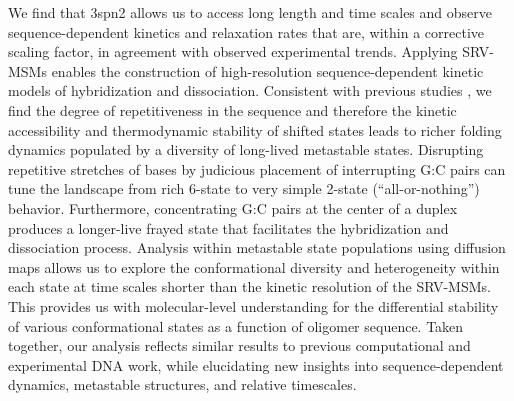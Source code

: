 \documentclass[journal=jpcbfk,manuscript=article]{achemso}
\begin{document}
We find that 3spn2 allows us to access long length and time scales and observe sequence-dependent kinetics and relaxation rates that are, within a corrective scaling factor, in agreement with observed experimental trends. Applying SRV-MSMs enables the construction of high-resolution sequence-dependent kinetic models of hybridization and dissociation. Consistent with previous studies \citep{Phys2014,Romano2013DNADependence,Araque2016LatticeCooperativity}, we find the degree of repetitiveness in the sequence and therefore the kinetic accessibility and thermodynamic stability of shifted states leads to richer folding dynamics populated by a diversity of long-lived metastable states. Disrupting repetitive stretches of bases by judicious placement of interrupting G:C pairs can tune the landscape from rich 6-state to very simple 2-state (“all-or-nothing”) behavior. Furthermore, concentrating G:C pairs at the center of a duplex produces a longer-live frayed state that facilitates the hybridization and dissociation process. Analysis within metastable state populations using diffusion maps allows us to explore the conformational diversity and heterogeneity within each state at time scales shorter than the kinetic resolution of the SRV-MSMs. This provides us with molecular-level understanding for the differential stability of various conformational states as a function of oligomer sequence. Taken together, our analysis reflects similar results to previous computational and experimental DNA work, while elucidating new insights into sequence-dependent dynamics, metastable structures, and relative timescales. 



\end{document}
